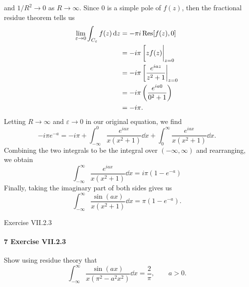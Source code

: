 \documentclass[12pt]{article}
\newenvironment{fullbox}{\begin{lrbox}{\savefullbox}\begin{minipage}{\dimexpr\textwidth-2\fboxsep\relax}}{\end{minipage}\end{lrbox}\begin{center}\framebox[\textwidth]{\usebox{\savefullbox}}\end{center}}
\newenvironment{pbox}[1][]{\begin{fullbox}\ifx#1\empty\else\paragraph{#1}\fi}{\end{fullbox}}
\theoremstyle{definition}
\newcommand{\eps}{\varepsilon}
\newcommand{\pfrac}[2]{\left(\frac{#1}{#2}\right)}
\begin{document}
and $1/R^2 \to 0$ as $R \to \infty$. Since $0$ is a simple pole of $f(z)$, then the fractional residue theorem tells us
\begin{align*}
    \lim_{\eps \to 0} \int_{C_\eps} f(z) \dd{z}
        &= -\pi i \Res[f(z), 0] \\
        &= -i\pi \eval[z f(z)|_{z=0} \\
        &= -i\pi \eval[\frac{e^{iaz}}{z^2 + 1}|_{z=0} \\
        &= -i\pi \pfrac{e^{ia0}}{0^2 + 1} \\
        &= -i\pi.
\end{align*}
Letting $R \to \infty$ and $\eps \to 0$ in our original equation, we find
\[
    -i\pi e^{-a} = -i\pi + \int_{-\infty}^{0} \frac{e^{iax}}{x(x^2+1)} \dd{x} + \int_{0}^{\infty} \frac{e^{iax}}{x(x^2+1)} \dd{x}.
\]
Combining the two integrals to be the integral over $(-\infty, \infty)$ and rearranging, we obtain
\[
    \int_{-\infty}^{\infty} \frac{e^{iax}}{x(x^2+1)} \dd{x}
        = i\pi(1 - e^{-a})
\]
Finally, taking the imaginary part of both sides gives us
\[
    \int_{-\infty}^{\infty} \frac{\sin(ax)}{x(x^2+1)} \dd{x}
        = \pi(1 - e^{-a}).
\]




\newpage
\begin{pbox}[7 Exercise VII.2.3]
    Show using residue theory that
    \[
        \int_{-\infty}^{\infty} \frac{\sin(ax)}{x(\pi^2 - a^2 x^2)} \dd{x} = \frac{2}{\pi}, \qquad a > 0.
    \]
\end{pbox}
\end{document}

